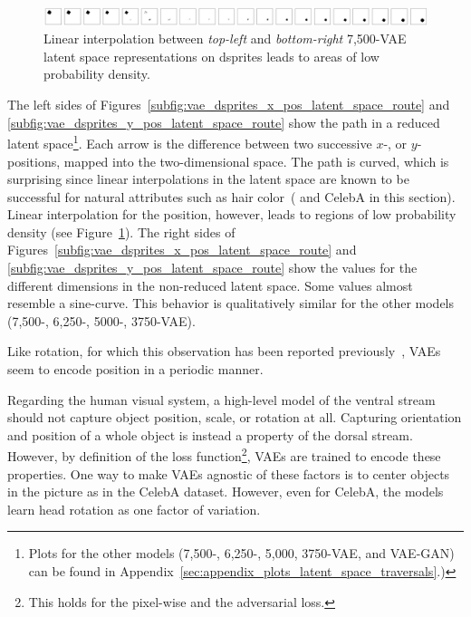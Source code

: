 \begin{figure}
    \centering
    \includegraphics[width=\textwidth]{images/latent_space_traversals/vae_dsprites_7500_position.png}
    \caption[7,500-VAE - Areas of Low Probability Density]{Linear interpolation between \textit{top-left} and \textit{bottom-right} 7,500-VAE latent space representations on dsprites leads to areas of low probability density.}
    \label{fig:vae_7500_dsprites_position_interpolation}
\end{figure}
The left sides of Figures~\ref{subfig:vae_dsprites_x_pos_latent_space_route} and \ref{subfig:vae_dsprites_y_pos_latent_space_route} show the path in a reduced latent space\footnote{Plots for the other models (7,500-, 6,250-, 5,000, 3750-\ac{VAE}, and \ac{VAE}-\ac{GAN}) can be found in Appendix~\ref{sec:appendix_plots_latent_space_traversals}.)}.
Each arrow is the difference between two successive $x$-, or $y$-positions, mapped into the two-dimensional space.
The path is curved, which is surprising since linear interpolations in the latent space are known to be successful for natural attributes such as hair color~(\citep{radford2016deep} and CelebA in this section).
Linear interpolation for the position, however, leads to regions of low probability density (see Figure~\ref{fig:vae_7500_dsprites_position_interpolation}).
The right sides of Figures~\ref{subfig:vae_dsprites_x_pos_latent_space_route} and \ref{subfig:vae_dsprites_y_pos_latent_space_route} show the values for the different dimensions in the non-reduced latent space.
Some values almost resemble a sine-curve.
This behavior is qualitatively similar for the other models (7,500-, 6,250-, 5000-, 3750-\ac{VAE}).

Like rotation, for which this observation has been reported previously~\citep{chen2018isolating}, \acp{VAE} seem to encode position in a periodic manner.

Regarding the human visual system, a high-level model of the ventral stream should not capture object position, scale, or rotation at all.
Capturing orientation and position of a whole object is instead a property of the dorsal stream.
However, by definition of the loss function\footnote{This holds for the pixel-wise and the adversarial loss.}, \acp{VAE} are trained to encode these properties.
One way to make \acp{VAE} agnostic of these factors is to center objects in the picture as in the CelebA dataset.
However, even for CelebA, the models learn head rotation as one factor of variation.

